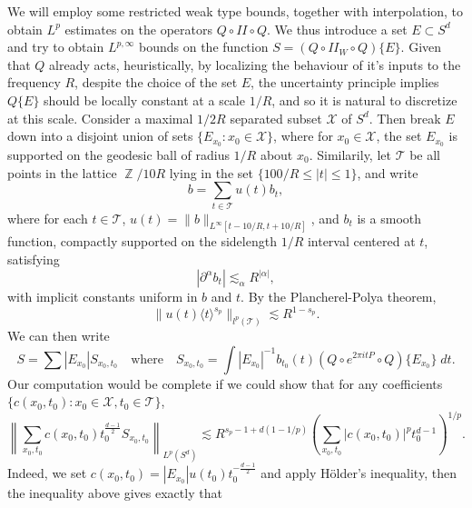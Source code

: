 \documentclass[dvipsnames,letterpaper,12pt]{article}
\DeclareMathOperator{\RR}{\mathbb{R}}
\DeclareMathOperator{\ZZ}{\mathbb{Z}}
\begin{document}
We will employ some restricted weak type bounds, together with interpolation, to obtain $L^p$ estimates on the operators $Q \circ II \circ Q$. We thus introduce a set $E \subset S^d$ and try to obtain $L^{p,\infty}$ bounds on the function $S = (Q \circ II_W \circ Q) \{ E \}$. Given that $Q$ already acts, heuristically, by localizing the behaviour of it's inputs to the frequency $R$, despite the choice of the set $E$, the uncertainty principle implies $Q \{ E \}$ should be locally constant at a scale $1/R$, and so it is natural to discretize at this scale. Consider a maximal $1/2R$ separated subset $\mathcal{X}$ of $S^d$. Then break $E$ down into a disjoint union of sets $\{ E_{x_0}: x_0 \in \mathcal{X} \}$, where for $x_0 \in \mathcal{X}$, the set $E_{x_0}$ is supported on the geodesic ball of radius $1/R$ about $x_0$. Similarily, let $\mathcal{T}$ be all points in the lattice $\ZZ / 10 R$ lying in the set $\{ 100/R \leq |t| \leq 1 \}$, and write
%
\[ b = \sum_{t \in \mathcal{T}} u(t) b_t, \]
%
where for each $t \in \mathcal{T}$, $u(t) = \| b \|_{L^\infty[t - 10/R, t + 10/R]}$, and $b_t$ is a smooth function, compactly supported on the sidelength $1/R$ interval centered at $t$, satisfying
%
\[ |\partial^\alpha b_t| \lesssim_\alpha R^{|\alpha|}, \]
%
with implicit constants uniform in $b$ and $t$. By the Plancherel-Polya theorem, 
%
\[ \| u(t) \langle t \rangle^{s_p} \|_{l^p(\mathcal{T})} \lesssim R^{1 - s_p}. \]
%
%
%
We can then write
%
\[ S = \sum |E_{x_0}| {S\!}_{x_0,t_0} \quad\text{where}\quad {S\!}_{x_0,t_0} = \int |E_{x_0}|^{-1} b_{t_0}(t) (Q \circ e^{2 \pi i t P} \circ Q) \{ E_{x_0} \}\; dt. \]
%
%
%
Our computation would be complete if we could show that for any coefficients $\{ c(x_0,t_0) : x_0 \in \mathcal{X}, t_0 \in \mathcal{T} \}$,
%
\[ \left\| \sum_{x_0,t_0} c(x_0,t_0) t_0^{\frac{d-1}{2}} {S\!}_{x_0,t_0} \right\|_{L^p(S^d)} \lesssim R^{s_p - 1 + d(1 - 1/p)} \left( \sum_{x_0,t_0} |c(x_0,t_0)|^p t_0^{d-1} \right)^{1/p}. \]
%
Indeed, we set $c(x_0,t_0) = |E_{x_0}| u(t_0) t_0^{- \frac{d-1}{2}}$ and apply H\"{o}lder's inequality, then the inequality above gives exactly that
\end{document}

